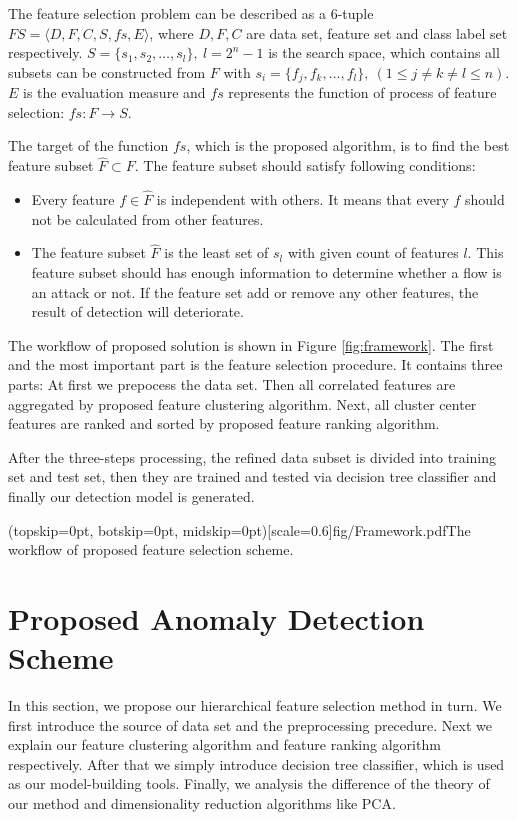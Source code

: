 \documentclass{ieeeaccess}
\theoremstyle{definition}
\begin{document}
The feature selection problem\cite{Maza2018} can be described as a 6-tuple $FS=\langle D, F, C, S, fs, E \rangle$, where $D, F, C$ are data set, feature set and class label set respectively. $S=\{s_1, s_2, \ldots, s_l\}, \ l=2^n-1$ is the search space, which contains all subsets can be constructed from $F$ with $s_i=\{f_j, f_k, \ldots, f_l\}, \ (1 \leqslant j \neq k \neq l \leqslant n)$. $E$ is the evaluation measure and $fs$ represents the function of process of feature selection: $fs: F \rightarrow S$.

The target of the function $fs$, which is the proposed algorithm, is to find the best feature subset $\hat{F} \subset F$. The feature subset should satisfy following conditions:
\begin{itemize}
    \item Every feature $f \in \hat{F}$ is independent with others. It means that every $f$ should not be calculated from other features.
    \item The feature subset $\hat{F}$ is the least set of $s_l$ with given count of features $l$. This feature subset should has enough information to determine whether a flow is an attack or not. If the feature set add or remove any other features, the result of detection will deteriorate.
\end{itemize}

The workflow of proposed solution is shown in Figure \ref{fig:framework}.
The first and the most important part is the feature selection procedure. It contains three parts: At first we prepocess the data set. Then all correlated features are aggregated by proposed feature clustering algorithm. Next, all cluster center features are ranked and sorted by proposed feature ranking algorithm.

After the three-steps processing, the refined data subset is divided into training set and test set, then they are trained and tested via decision tree classifier and finally our detection model is generated. 

\Figure[t](topskip=0pt, botskip=0pt, midskip=0pt)[scale=0.6]{fig/Framework.pdf}{The workflow of proposed feature selection scheme.\label{fig:framework}}

\section{Proposed Anomaly Detection Scheme}
\label{sec:methods}

In this section, we propose our hierarchical feature selection method in turn. We first introduce the source of data set and the preprocessing precedure. Next we explain our feature clustering algorithm and feature ranking algorithm respectively. After that we simply introduce decision tree classifier, which is used as our model-building tools. Finally, we analysis the difference of the theory of our method and dimensionality reduction algorithms like PCA.
\end{document}

